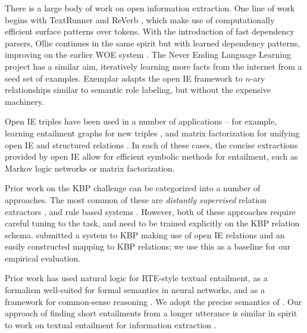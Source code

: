 There is a large body of work on open information extraction.
One line of work begins with
  TextRunner \cite{key:2007yates-textrunner} and
  ReVerb \cite{key:2011fader-reverb}, which make use of computationally
  efficient surface patterns over tokens.
With the introduction of fast dependency parsers,
  Ollie \cite{key:2012mausam-ollie} continues in the same spirit but with
  learned dependency patterns, improving on the earlier WOE system
  \cite{key:2010wu-openie}.
The Never Ending Language Learning project \cite{key:2010carlson-nell}
  has a similar aim, iteratively learning more facts from the internet
  from a seed set of examples.
Exemplar \cite{key:2013mesquita-exemplar} adapts the open IE framework to
  $n$-ary relationships similar to semantic role labeling, but without the
  expensive machinery.

Open IE triples have been used in a number of applications --
  for example, learning entailment graphs for new triples
  \cite{key:2011berant-entailment}, and
  matrix factorization for unifying open IE and structured relations
  \cite{key:2012yao-schemas,key:2013riedel-schemas}.
In each of these cases, the concise extractions provided by open IE allow
  for efficient symbolic methods for entailment, such as Markov logic
  networks or matrix factorization.

Prior work on the KBP challenge can be categorized into a number of approaches.
The most common of these are \textit{distantly supervised} relation extractors
  \cite{key:1999craven-distsup,key:2007wu-distsup,key:2009mintz-distsup,key:2011sun-kbp},
  and rule based systems
  \cite{key:1997soderland-kbp,key:2010grishman-kbp,key:2010chen-kbp}.
However, both of these approaches require careful tuning to the task, and
  need to be trained explicitly on the KBP relation schema.
 submitted a system to KBP making use of
  open IE relations and an easily constructed mapping to KBP relations;
  we use this as a baseline for our empirical evaluation.

Prior work has used natural logic
  for RTE-style textual entailment,
  as a formalism well-suited for formal semantics in neural networks,
  and as a framework for common-sense reasoning
  \cite{key:2009maccartney-natlog,key:2012watanabe-natlog,key:2014bowman-natlog,key:2013angeli-truth}.
We adopt the precise semantics of .
Our approach of finding short entailments from a longer utterance is similar
  in spirit to work on textual entailment for information extraction
  \cite{key:2006romano-ie}.

